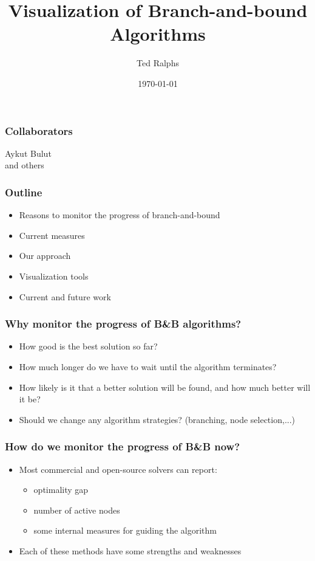 \documentclass{beamer}
\title[Visualization]{Visualization of Branch-and-bound Algorithms}
\author[Ted]{Ted Ralphs}
\institute[Lehigh University]{Lehigh University}
\date{\today}
\begin{document}
\begin{frame}
\titlepage
\end{frame}

\begin{frame}
\frametitle{Collaborators}
\begin{center}
Aykut Bulut\\
and others
\end{center}
\end{frame}

\begin{frame}
\frametitle{Outline}
\begin{itemize}
\item Reasons to monitor the progress of branch-and-bound
\item Current measures
\item Our approach
\item Visualization tools
\item Current and future work
\end{itemize}
\end{frame}

\begin{frame}
\frametitle{Why monitor the progress of B\&B algorithms?}

\uncover<+->{}
\begin{itemize}[<+->]
\item How good is the best solution so far?
\item How much longer do we have to wait until the algorithm terminates?
\item How likely is it that a better solution will be found, and how much better will it be?
\item Should we change any algorithm strategies? (branching, node selection,...) 
\end{itemize}
\end{frame}

\begin{frame}
\frametitle{How do we monitor the progress of B\&B now?}

\begin{itemize}[<+->]
\item Most commercial and open-source solvers can report:
    \begin{itemize}
    \item optimality gap
    \item number of active nodes
    \item some internal measures for guiding the algorithm
    \end{itemize} 
\item Each of these methods have some strengths and weaknesses 
\end{itemize}
\end{frame}
\end{document}
